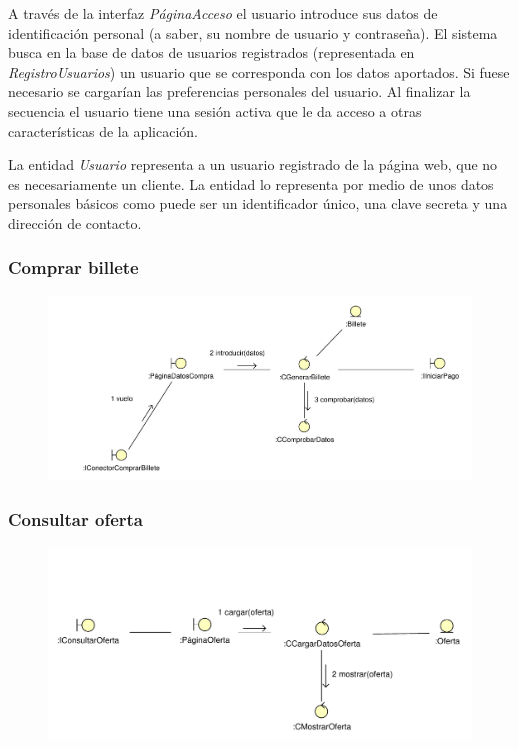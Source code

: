 \documentclass[11pt, a4paper, twoside, titlepage]{article}
\begin{document}
				A través de la interfaz {\itshape PáginaAcceso} el usuario introduce sus datos de identificación personal (a saber, su nombre de usuario y contraseña). El sistema busca en la base de datos de usuarios registrados (representada en {\itshape RegistroUsuarios}) un usuario que se corresponda con los datos aportados. Si fuese necesario se cargarían las preferencias personales del usuario. Al finalizar la secuencia el usuario tiene una sesión activa que le da acceso a otras características de la aplicación.

				La entidad {\itshape Usuario} representa a un usuario registrado de la página web, que no es necesariamente un cliente. La entidad lo representa por medio de unos datos personales básicos como puede ser un identificador único, una clave secreta y una dirección de contacto.

			\subsubsection{Comprar billete}
				\begin{figure}[H]\centering
					\includegraphics[scale=.72]{diagramas/comprarbillete.pdf}
				\end{figure}

			\subsubsection{Consultar oferta}
				\begin{figure}[H]\centering
					\includegraphics[scale=.85]{diagramas/consultaroferta.pdf}
				\end{figure}
\end{document}

